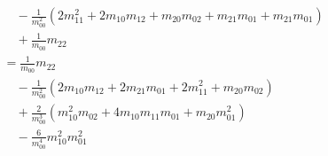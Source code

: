 \begin{align*}
\begin{aligned}
  &\quad
    - \frac{1}{m_{00}^2}
      \left(
        2 m_{11}^2 + 2 m_{10}m_{12} + m_{20}m_{02} + m_{21}m_{01} + m_{21}m_{01}
      \right) \\
  &\quad
    + \frac{1}{m_{00}} m_{22}\\
  & = \frac{1}{m_{00}} m_{22} \\
    &\quad
    - \frac{1}{m_{00}^2}
    \left(
       2 m_{10}m_{12}  + 2 m_{21}m_{01} + 2 m_{11}^2 + m_{20}m_{02}
    \right) \\
    &\quad
    + \frac{2}{m_{00}^3}
      \left(
        m_{10}^2 m_{02} + 4 m_{10}m_{11}m_{01} + m_{20}m_{01}^2
      \right)\\
    &\quad
       - \frac{6}{m_{00}^4} m_{10}^2 m_{01}^2
  \end{aligned}
\end{align*}
